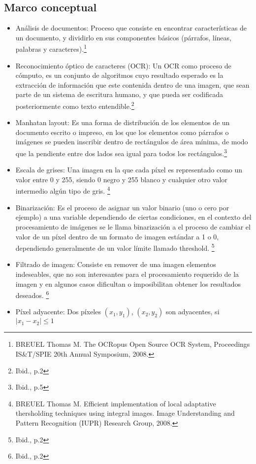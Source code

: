 \documentclass[a4paper, 11pt, oneside]{article}
\begin{document}
	\subsection{Marco conceptual}
	\begin{itemize}
    \item Análisis de documentos: Proceso que consiste en encontrar características de un documento,
    y dividirlo en sus componentes básicos (párrafos, líneas, palabras y caracteres).\footnote{
	BREUEL Thomas M. The OCRopus Open Source OCR System, Proceedings IS\&T/SPIE 20th Annual Symposium, 2008.}
    \item Reconocimiento óptico de caracteres (OCR): Un OCR como proceso de cómputo, es un conjunto de
    algoritmos cuyo resultado esperado es la extracción de información  que este contenida dentro de
    una imagen, que sean parte de un sistema de escritura humano, y que pueda ser codificada
    posteriormente como texto entendible.\footnote{Ibid., p.2}
    \item Manhatan layout: Es una forma de distribución de los elementos de un documento escrito o
    impreso, en los que los elementos como párrafos o imágenes se pueden inscribir
    dentro de rectángulos de área mínima, de modo que la pendiente entre dos lados sea igual para
    todos los rectángulos.\footnote{Ibid., p.5}
    \item Escala de grises: Una imagen en la que cada píxel es representado como un valor entre 0 y
    255, siendo 0 negro y 255 blanco y cualquier otro valor intermedio algún tipo de gris. \footnote{
    BREUEL Thomas M. Efficient implementation of local adaptative thersholding techniques using integral 
    images. Image Understanding and Pattern Recognition (IUPR) Research Group, 2008.}
    \item Binarización:	Es el proceso de asignar un valor binario (uno o cero por ejemplo) a una
    variable dependiendo de	ciertas condiciones, en el contexto del procesamiento de imágenes se le
    llama binarización a el proceso de cambiar el valor de un píxel dentro de un formato de imagen
    estándar a 1 o 0, dependiendo generalmente de un valor límite llamado threshold.
    \footnote{Ibid., p.2}
    \item Filtrado de imagen: Consiste en remover de una imagen elementos indeseables, que no
    son interesantes para el procesamiento requerido de la imagen y en algunos casos dificultan
    o imposibilitan obtener los resultados deseados.
    \footnote{Ibid., p.2}
    \item Píxel adyacente: Dos píxeles $(x_1,y_1)$, $(x_2,y_2)$ son adyacentes, si $|x_1-x_2| \le 1$

\end{itemize}
\end{document}

